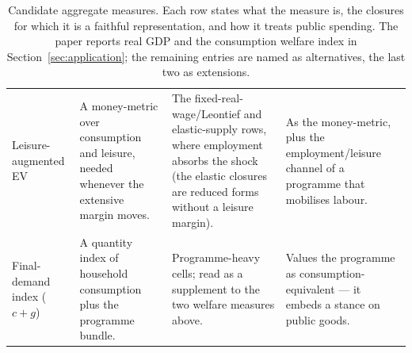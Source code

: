 \begin{table}[htbp]
\begin{tabular}{@{}>{\raggedright\arraybackslash}p{1.85cm}>{\raggedright\arraybackslash}p{3.9cm}>{\raggedright\arraybackslash}p{4.3cm}>{\raggedright\arraybackslash}p{4.3cm}@{}}
Leisure-augmented EV
& A money-metric over consumption and leisure, needed whenever the extensive margin moves.
& The fixed-real-wage/Leontief and elastic-supply rows, where employment absorbs the shock (the elastic closures are reduced forms without a leisure margin).
& As the money-metric, plus the employment/leisure channel of a programme that mobilises labour. \\
Final-demand index \newline \scriptsize ($c+g$)
& A quantity index of household consumption plus the programme bundle.
& Programme-heavy cells; read as a supplement to the two welfare measures above.
& Values the programme as consumption-equivalent --- it embeds a stance on public goods. \\
\bottomrule
\end{tabular}
\caption{Candidate aggregate measures. Each row states what the measure is,
the closures for which it is a faithful representation, and how it treats
public spending. The paper reports real GDP and the consumption welfare
index in Section~\ref{sec:application}; the remaining entries are named as
alternatives, the last two as extensions.}
\label{tab:welfare-measures}
\end{table}
